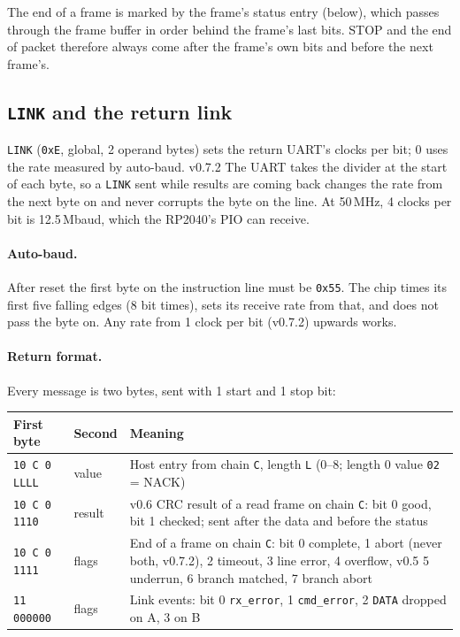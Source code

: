 \documentclass[11pt,a4paper]{article}
\newcommand{\vfive}{\textcolor{fivec}{\textsf{\small v0.5}}}
\newcommand{\vsix}{\textcolor{sixc}{\textsf{\small v0.6}}}
\newcommand{\vseventwo}{\textcolor{sevenc}{\textsf{\small v0.7.2}}}
\newcommand{\sig}[1]{\texttt{#1}}
\begin{document}
The end of a frame is marked by the frame's status entry (below), which passes through the frame buffer in order behind the frame's last bits. STOP and the end of packet therefore always come after the frame's own bits and before the next frame's.

\subsection{\sig{LINK} and the return link}

\sig{LINK} (\texttt{0xE}, global, 2 operand bytes) sets the return UART's clocks per bit; 0 uses the rate measured by auto-baud. \vseventwo{} The UART takes the divider at the start of each byte, so a \sig{LINK} sent while results are coming back changes the rate from the next byte on and never corrupts the byte on the line. At 50\,MHz, 4 clocks per bit is 12.5\,Mbaud, which the RP2040's PIO can receive.

\paragraph{Auto-baud.} After reset the first byte on the instruction line must be \texttt{0x55}. The chip times its first five falling edges (8 bit times), sets its receive rate from that, and does not pass the byte on. Any rate from 1 clock per bit (\vseventwo) upwards works.

\paragraph{Return format.} Every message is two bytes, sent with 1 start and 1 stop bit:
\begin{center}
\begin{tabularx}{\linewidth}{@{}l l >{\raggedright\arraybackslash}X@{}}
\toprule
First byte & Second & Meaning \\
\midrule
\texttt{10 C 0 LLLL} & value & Host entry from chain \texttt{C}, length \texttt{L} (0--8; length 0 value \texttt{02} = NACK) \\
\texttt{10 C 0 1110} & result & \vsix{} CRC result of a read frame on chain \texttt{C}: bit 0 good, bit 1 checked; sent after the data and before the status \\
\texttt{10 C 0 1111} & flags & End of a frame on chain \texttt{C}: bit 0 complete, 1 abort (never both, \vseventwo), 2 timeout, 3 line error, 4 overflow, \vfive{} 5 underrun, 6 branch matched, 7 branch abort \\
\texttt{11 000000} & flags & Link events: bit 0 \sig{rx\_error}, 1 \sig{cmd\_error}, 2 \sig{DATA} dropped on A, 3 on B \\
\bottomrule
\end{tabularx}
\end{center}
\end{document}
